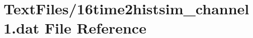 \hypertarget{16time2histsim__channel1_8dat}{}\section{Text\+Files/16time2histsim\+\_\+channel1.dat File Reference}
\label{16time2histsim__channel1_8dat}
